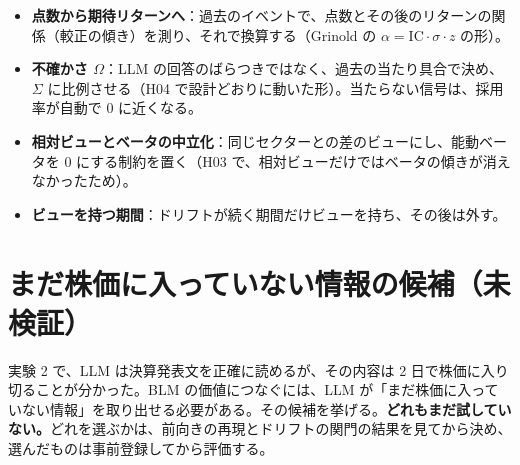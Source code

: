 \documentclass[xelatex,ja=standard,jafont=haranoaji,a4paper,10pt]{bxjsreport}
\begin{document}
\begin{itemize}
\item \textbf{点数から期待リターンへ}：過去のイベントで、点数とその後のリターンの関係（較正の傾き）を測り、それで換算する（Grinold の $\alpha=\mathrm{IC}\cdot\sigma\cdot z$ の形）。
\item \textbf{不確かさ $\Omega$}：LLM の回答のばらつきではなく、過去の当たり具合で決め、$\Sigma$ に比例させる（H04 で設計どおりに動いた形）。当たらない信号は、採用率が自動で 0 に近くなる。
\item \textbf{相対ビューとベータの中立化}：同じセクターとの差のビューにし、能動ベータを 0 にする制約を置く（H03 で、相対ビューだけではベータの傾きが消えなかったため）。
\item \textbf{ビューを持つ期間}：ドリフトが続く期間だけビューを持ち、その後は外す。
\end{itemize}

\section{まだ株価に入っていない情報の候補（未検証）}\label{sec:candidates}

実験 2 で、LLM は決算発表文を正確に読めるが、その内容は 2 日で株価に入り切ることが分かった。BLM の価値につなぐには、LLM が「まだ株価に入っていない情報」を取り出せる必要がある。その候補を挙げる。\textbf{どれもまだ試していない。}どれを選ぶかは、前向きの再現とドリフトの関門の結果を見てから決め、選んだものは事前登録してから評価する。
\end{document}
